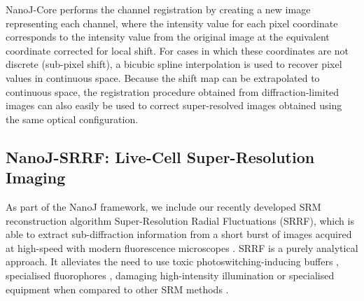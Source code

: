  NanoJ-Core performs the channel registration by creating a new image representing each channel, where the intensity value for each pixel coordinate corresponds to the intensity value from the original image at the equivalent coordinate corrected for local shift. For cases in which these coordinates are not discrete (sub-pixel shift), a bicubic spline interpolation is used to recover pixel values in continuous space. Because the shift map can be extrapolated to continuous space, the registration procedure obtained from diffraction-limited images can also easily be used to correct super-resolved images obtained using the same optical configuration.
 
\subsection*{NanoJ-SRRF: Live-Cell Super-Resolution Imaging}
 As part of the NanoJ framework, we include our recently developed SRM reconstruction algorithm Super-Resolution Radial Fluctuations (SRRF), which is able to extract sub-diffraction information from a short burst of images acquired at high-speed with modern fluorescence microscopes \cite{gustafsson2016fast,culley2018srrf}. SRRF is a purely analytical approach. It alleviates the need to use toxic photoswitching-inducing buffers \cite{henriques2011palm}, specialised fluorophores \cite{dempsey2011evaluation,henriques2009palm}, damaging high-intensity illumination \cite{waldchen2015light} or specialised equipment \cite{gustafsson2000surpassing,hell1994breaking} when compared to other SRM methods \cite{betzig2006imaging,rust2006sub,gustafsson2000surpassing,hell1994breaking}.
 
